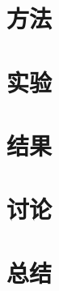 \documentclass[final,5p]{elsarticlezh}
\begin{document}

\section{方法} \label{methods}




\section{实验} \label{experiments}




\section{结果} \label{results}




\section{讨论} \label{discussion}




\section{总结} \label{summary}


\end{document}

